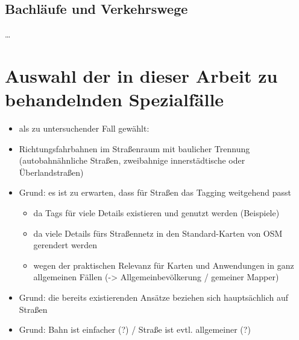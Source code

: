 \documentclass[../main/thesis.tex]{subfiles}
\begin{document}


\subsection{Bachläufe und Verkehrswege}

…





\section{Auswahl der in dieser Arbeit zu behandelnden Spezialfälle}

\begin{itemize}
	
	
	\item als zu untersuchender Fall gewählt:
	
	\item Richtungsfahrbahnen im Straßenraum mit baulicher Trennung
		(autobahnähnliche Straßen, zweibahnige innerstädtische oder Überlandstraßen)
	
	\item Grund: es ist zu erwarten, dass für Straßen das Tagging weitgehend passt
	\begin{itemize}
		\item da Tags für viele Details existieren und genutzt werden (Beispiele)
		\item da viele Details fürs Straßennetz in den Standard-Karten von OSM gerendert werden
		\item wegen der praktischen Relevanz für Karten und Anwendungen in ganz allgemeinen Fällen
			(-> Allgemeinbevölkerung / gemeiner Mapper)
	\end{itemize}
	\item Grund: die bereits existierenden Ansätze beziehen sich hauptsächlich auf Straßen
	\item Grund: Bahn ist einfacher (?) / Straße ist evtl. allgemeiner (?)
	
	

\end{itemize}
\end{document}

